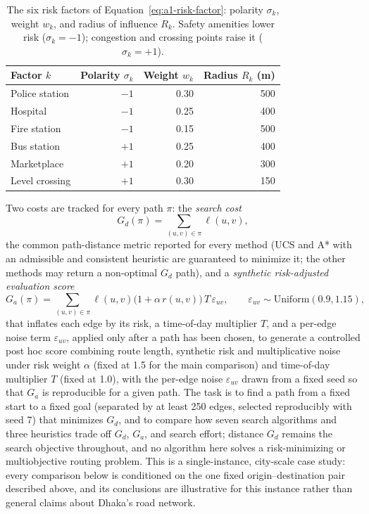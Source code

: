 \documentclass{ai-lab-report}
\begin{document}
\begin{table}[H]
\centering
\small
\caption{The six risk factors of Equation~\eqref{eq:a1-risk-factor}: polarity $\sigma_k$, weight $w_k$, and radius of influence $R_k$. Safety amenities lower risk ($\sigma_k=-1$); congestion and crossing points raise it ($\sigma_k=+1$).}
\label{tab:a1-factors}
\begin{tabular}{lrrr}
\toprule
Factor $k$ & Polarity $\sigma_k$ & Weight $w_k$ & Radius $R_k$ (m) \\
\midrule
Police station  & $-1$ & 0.30 & 500 \\
Hospital        & $-1$ & 0.25 & 400 \\
Fire station    & $-1$ & 0.15 & 500 \\
Bus station     & $+1$ & 0.25 & 400 \\
Marketplace     & $+1$ & 0.20 & 300 \\
Level crossing  & $+1$ & 0.30 & 150 \\
\bottomrule
\end{tabular}
\end{table}

Two costs are tracked for every path $\pi$: the \emph{search cost}
\begin{equation}
G_d(\pi)=\sum_{(u,v)\in\pi}\ell(u,v),
\label{eq:a1-search-cost}
\end{equation}
the common path-distance metric reported for every method (UCS and A* with an admissible and consistent heuristic are guaranteed to minimize it; the other methods may return a non-optimal $G_d$ path), and a \emph{synthetic risk-adjusted evaluation score}
\begin{equation}
G_a(\pi) = \sum_{(u,v)\in\pi} \ell(u,v)\big(1+\alpha\, r(u,v)\big)\,T\,\varepsilon_{uv}, \qquad \varepsilon_{uv}\sim\mathrm{Uniform}(0.9,1.15),
\label{eq:a1-actual-cost}
\end{equation}
that inflates each edge by its risk, a time-of-day multiplier $T$, and a per-edge noise term $\varepsilon_{uv}$, applied only after a path has been chosen, to generate a controlled post hoc score combining route length, synthetic risk and multiplicative noise under risk weight $\alpha$ (fixed at 1.5 for the main comparison) and time-of-day multiplier $T$ (fixed at 1.0), with the per-edge noise $\varepsilon_{uv}$ drawn from a fixed seed so that $G_a$ is reproducible for a given path. The task is to find a path from a fixed start to a fixed goal (separated by at least 250 edges, selected reproducibly with seed 7) that minimizes $G_d$, and to compare how seven search algorithms and three heuristics trade off $G_d$, $G_a$, and search effort; distance $G_d$ remains the search objective throughout, and no algorithm here solves a risk-minimizing or multiobjective routing problem. This is a single-instance, city-scale case study: every comparison below is conditioned on the one fixed origin--destination pair described above, and its conclusions are illustrative for this instance rather than general claims about Dhaka's road network.
\end{document}

